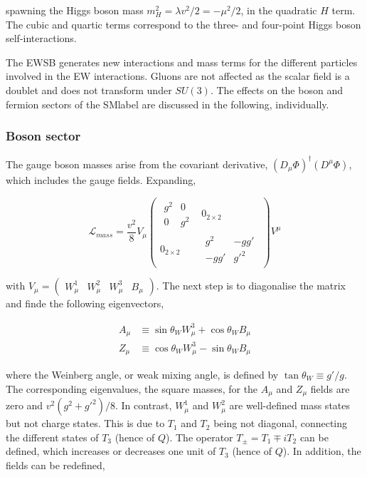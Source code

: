 spawning the Higgs boson mass $m_H^2=\lambda v^2/2 = -\mu^2/2$, in the quadratic $H$ term.
The cubic and quartic terms correspond to the three- and four-point Higgs boson self-interactions.

The \acrshort{EWSB} generates new interactions and mass terms for the different particles involved in the \acrshort{EW} interactions.
Gluons are not affected as the scalar field is a doublet and does not transform under $SU(3)$.
The effects on the boson and fermion sectors of the \acrshort{SMlabel} are discussed in the following, individually. 

\subsubsection{Boson sector}

The gauge boson masses arise from the covariant derivative, $(D_\mu\Phi)^\dag(D^\mu\Phi)$, which includes the gauge fields.
Expanding,

\begin{equation}
\label{Theory_eq:Lgaugemass}
\mathcal{L}_{mass} = \frac{v^2}{8}
V_\mu
\begin{pmatrix} \begin{matrix} g^2 & 0 \\ 0 & g^2 \end{matrix} & 0_{2\times2} \\ 0_{2\times2} & \begin{matrix} g^2 & -gg' \\ -gg' & g'^2 \end{matrix}
\end{pmatrix} V^\mu 
\end{equation}

with $V_\mu = \begin{pmatrix} W_\mu^1 & W_\mu^2 & W_\mu^3 & B_\mu
\end{pmatrix}$. The next step is to diagonalise the matrix and finde the following eigenvectors,

\begin{equation}
\begin{split}
    A_\mu &\equiv \sin\theta_W W_\mu^3 + \cos\theta_WB_\mu \\
    Z_\mu &\equiv \cos\theta_W W_\mu^3 - \sin\theta_WB_\mu  
\end{split}
\end{equation}

where the Weinberg angle, or weak mixing angle, is defined by $\tan\theta_W\equiv g'/g$. The corresponding eigenvalues, the square masses, for the $A_\mu$ and $Z_\mu$ fields are zero and $v^2(g^2+g'^2)/8$. In contrast, $W_\mu^1$ and $W_\mu^2$ are well-defined mass states but not charge states. This is due to $T_1$ and $T_2$ being not diagonal, connecting the different states of $T_3$ (hence of $Q$). The operator $T_\pm=T_1\mp iT_2$ can be defined, which increases or decreases one unit of $T_3$ (hence of $Q$). In addition, the fields can be redefined,

